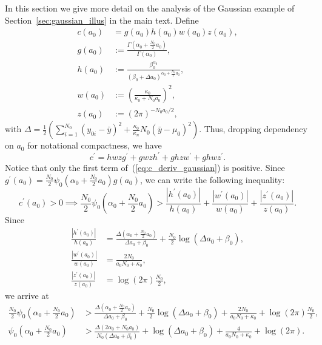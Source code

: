 \documentclass[a4paper, notitlepage, 11pt]{article}
\begin{document}
In this section we give more detail on the analysis of the Gaussian example of Section~\ref{sec:gaussian_illus} in the main text.
Define
\begin{align*}
 c(a_0) &= g(a_0)h(a_0)w(a_0)z(a_0), \\
 g(a_0) &:=  \frac{\Gamma\left( \alpha_0 + \frac{N_0}{2}a_0 \right)}{\Gamma(\alpha_0)}, \\
 h(a_0) &:= \frac{\beta_0^{\alpha_0}}{ \left(  \beta_0 + \Delta a_0\right)^{\alpha_0 + \frac{N_0}{2}a_0}}, \\
 w(a_0) &:= \left(\frac{\kappa_0}{\kappa_0 + N_0 a_0} \right)^2 , \\
 z(a_0) &:= (2\pi)^{-N_0 a_0/2}, 
\end{align*}
with $\Delta =  \frac{1}{2}\left( \sum_{i=1}^{N_0}(y_{0i}-\bar{y})^2 + \frac{\kappa_0}{\kappa_n} N_0 (\bar{y}-\mu_0)^2 \right)$.
Thus, dropping dependency on $a_0$ for notational compactness, we have
\begin{equation}
\label{eq:c_deriv_gaussian}
 c^\prime = h w z g^\prime + g w z h^\prime + g h z w^\prime + g h w z^\prime.
\end{equation}
Notice that only the first term of~(\ref{eq:c_deriv_gaussian}) is positive.
Since $g^\prime(a_0) = \frac{N_0}{2} \psi_0\left( \alpha_0 +  \frac{N_0}{2} a_0 \right)g(a_0)$, we can write the following inequality:
\begin{equation*}
 c^\prime(a_0) > 0 \implies \frac{N_0}{2} \psi_0\left( \alpha_0 +  \frac{N_0}{2} a_0 \right) > \frac{|h^\prime(a_0)|}{h(a_0)} + \frac{|w^\prime(a_0)|}{w(a_0)} + \frac{|z^\prime(a_0)|}{z(a_0)}.
\end{equation*}
Since
\begin{align*}
 \frac{|h^\prime(a_0)|}{h(a_0)}  &=  \frac{\Delta\left( \alpha_0 + \frac{N_0}{2} a_0 \right) }{\Delta a_0 + \beta_0} + \frac{N_0}{2}\log{\left( \Delta a_0+ \beta_0 \right) }, \\
 \frac{|w^\prime(a_0)|}{w(a_0)}  &= \frac{2N_0}{a_0N_0+\kappa_0},\\
\frac{|z^\prime(a_0)|}{z(a_0)}  &= \log(2\pi) \frac{N_0}{2},
\end{align*}
we arrive at
\begin{align}
\nonumber
 \frac{N_0}{2} \psi_0\left( \alpha_0 +  \frac{N_0}{2} a_0 \right) &>  \frac{\Delta\left( \alpha_0 + \frac{N_0}{2} a_0 \right) }{\Delta a_0 + \beta_0} + \frac{N_0}{2}\log{\left( \Delta a_0+ \beta_0 \right) } + \frac{2N_0}{a_0N_0+\kappa_0} + \log(2\pi) \frac{N_0}{2}, \\
\psi_0\left( \alpha_0 +  \frac{N_0}{2} a_0 \right) &>  \frac{\Delta\left( 2\alpha_0 + N_0a_0 \right) }{N_0\left(\Delta a_0 + \beta_0\right)} + \log{\left( \Delta a_0+ \beta_0 \right) } + \frac{4}{a_0N_0+\kappa_0} + \log(2\pi).
\end{align}
\end{document}
